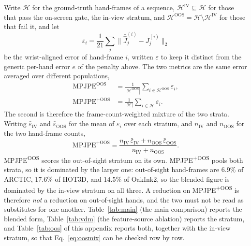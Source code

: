 \documentclass[10pt,twocolumn,letterpaper]{article}
\begin{document}
Write $\mathcal{H}$ for the ground-truth hand-frames of a sequence, $\mathcal{H}^{\mathrm{IV}}\subseteq\mathcal{H}$ for those that pass the on-screen gate, the in-view stratum, and $\mathcal{H}^{\mathrm{OOS}}=\mathcal{H}\setminus\mathcal{H}^{\mathrm{IV}}$ for those that fail it, and let
\begin{equation}
\varepsilon_i=\frac{1}{21}\sum_j \lVert \bar{\hat J}^{(i)}_j-\bar J^{(i)}_j\rVert_2
\end{equation}
be the wrist-aligned error of hand-frame $i$, written $\varepsilon$ to keep it distinct from the generic per-hand error $e$ of the penalty above. The two metrics are the same error averaged over different populations,
\begin{equation}
\begin{aligned}
\mathrm{MPJPE}^{\mathrm{OOS}}&=\frac{1}{|\mathcal{H}^{\mathrm{OOS}}|}\sum_{i\in\mathcal{H}^{\mathrm{OOS}}} \varepsilon_i,\\
\mathrm{MPJPE}^{+\mathrm{OOS}}&=\frac{1}{|\mathcal{H}|}\sum_{i\in\mathcal{H}} \varepsilon_i.
\end{aligned}
\end{equation}
The second is therefore the frame-count-weighted mixture of the two strata. Writing $\bar\varepsilon_{\mathrm{IV}}$ and $\bar\varepsilon_{\mathrm{OOS}}$ for the mean of $\varepsilon_i$ over each stratum, and $n_{\mathrm{IV}}$ and $n_{\mathrm{OOS}}$ for the two hand-frame counts,
\begin{equation}
\mathrm{MPJPE}^{+\mathrm{OOS}}=\frac{n_{\mathrm{IV}}\,\bar\varepsilon_{\mathrm{IV}}+n_{\mathrm{OOS}}\,\bar\varepsilon_{\mathrm{OOS}}}{n_{\mathrm{IV}}+n_{\mathrm{OOS}}}.
\label{eq:oosmix}
\end{equation}
MPJPE\textsuperscript{OOS} scores the out-of-sight stratum on its own. MPJPE\textsuperscript{+OOS} pools both strata, so it is dominated by the larger one: out-of-sight hand-frames are $6.9\%$ of ARCTIC, $17.6\%$ of HOT3D, and $14.5\%$ of OakInk2, so the blended figure is dominated by the in-view stratum on all three. A reduction on MPJPE\textsuperscript{+OOS} is therefore \emph{not} a reduction on out-of-sight hands, and the two must not be read as substitutes for one another. Table~\ref{tab:main} (the main comparison) reports the blended form, Table~\ref{tab:vdm} (the feature-source ablation) reports the stratum, and Table~\ref{tab:oos} of this appendix reports both, together with the in-view stratum, so that Eq.~\eqref{eq:oosmix} can be checked row by row.
\end{document}
